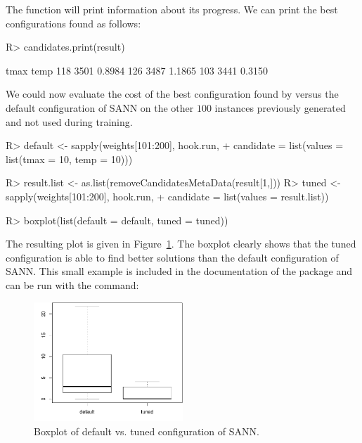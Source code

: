 \documentclass[article,a4paper,nojss,notitle]{jss}
\newcommand{\irace}{\pkg{irace}\xspace}
\begin{document}
The function  will print information about its progress. We can print the best configurations found as follows:

\begin{CodeChunk}
\begin{CodeInput}
R> candidates.print(result)
\end{CodeInput}
\begin{CodeOutput}
      tmax   temp
118 3501 0.8984
126 3487 1.1865
103 3441 0.3150
\end{CodeOutput}
\end{CodeChunk}

We could now evaluate the cost of the best configuration found by
\irace versus the default configuration of SANN on the other $100$
instances previously generated and not used during training.

\begin{CodeChunk}
\begin{CodeInput}
R> default <- sapply(weights[101:200], hook.run,
+                    candidate = list(values = list(tmax = 10, temp = 10)))

R> result.list <- as.list(removeCandidatesMetaData(result[1,]))
R> tuned <- sapply(weights[101:200], hook.run,
+                  candidate = list(values = result.list))

R> boxplot(list(default = default, tuned = tuned))
\end{CodeInput}
\end{CodeChunk}      

The resulting plot is given in Figure~\ref{fig:boxplot_sann}. The
boxplot clearly shows that the tuned configuration is able to find
better solutions than the default configuration of SANN. This small example is included in the documentation of the \irace package and can be run with the command:



\begin{figure}
  \centering
  \includegraphics[width=0.5\textwidth]{boxplot-sann.pdf}
  \caption{Boxplot of default vs. tuned configuration of SANN.}
  \label{fig:boxplot_sann}
\end{figure}
\end{document}
